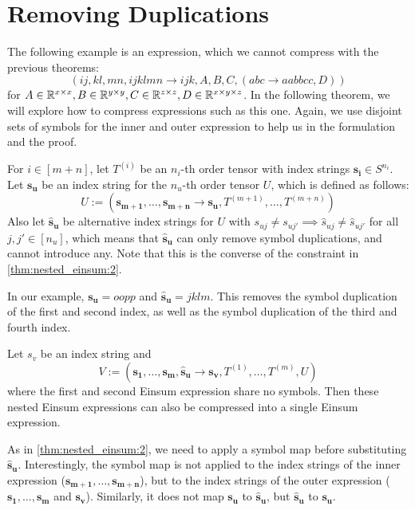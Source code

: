 \section{Removing Duplications}

The following example is an expression, which we cannot compress with the previous theorems:
$$(ij, kl, mn, ijklmn \rightarrow ijk, A, B, C, (abc \rightarrow aabbcc, D))$$
for $A \in \mathbb{R}^{x \times x}, B \in \mathbb{R}^{y \times y}, C \in \mathbb{R}^{z \times z}, D \in \mathbb{R}^{x \times y \times z}$.
In the following theorem, we will explore how to compress expressions such as this one.
Again, we use disjoint sets of symbols for the inner and outer expression to help us in the formulation and the proof.

\begin{theorem}
    \label{thm:nested_einsum:3}

    For $i \in [m + n]$, let $T^{(i)}$ be an $n_i$-th order tensor with index strings $\bm{s_i} \in S^{n_i}$.
    Let $\bm{s_u}$ be an index string for the $n_u$-th order tensor $U$, which is defined as follows:
    $$U := (\bm{s_{m + 1}},\dots,\bm{s_{m + n}} \rightarrow \bm{s_u}, T^{(m + 1)},\dots,T^{(m + n)})$$
    Also let $\bm{\hat{s}_u}$ be alternative index strings for $U$ with $s_{uj} \neq s_{uj'} \implies \hat{s}_{uj} \neq \hat{s}_{uj'}$ for all $j, j' \in [n_u]$,
    which means that $\bm{\hat{s}_u}$ can only remove symbol duplications, and cannot introduce any.
    Note that this is the converse of the constraint in \autoref{thm:nested_einsum:2}.

    In our example, $\bm{s_u} = oopp$ and $\bm{\hat{s}_u} = jklm$.
    This removes the symbol duplication of the first and second index, as well as the symbol duplication of the third and fourth index.

    Let $s_v$ be an index string and
    $$V := (\bm{s_1},\dots,\bm{s_m}, \bm{\hat{s}_u} \rightarrow \bm{s_v}, T^{(1)},\dots,T^{(m)}, U)$$
    where the first and second Einsum expression share no symbols.
    Then these nested Einsum expressions can also be compressed into a single Einsum expression.

    As in \autoref{thm:nested_einsum:2}, we need to apply a symbol map before substituting $\bm{\hat{s}_u}$.
    Interestingly, the symbol map is not applied to the index strings of the inner expression ($\bm{s_{m + 1}},\dots,\bm{s_{m + n}}$),
    but to the index strings of the outer expression ($\bm{s_1},\dots,\bm{s_m}$ and $\bm{s_v}$).
    Similarly, it does not map $\bm{s_u}$ to $\bm{\hat{s}_u}$, but $\bm{\hat{s}_u}$ to $\bm{s_u}$.


\end{theorem}
